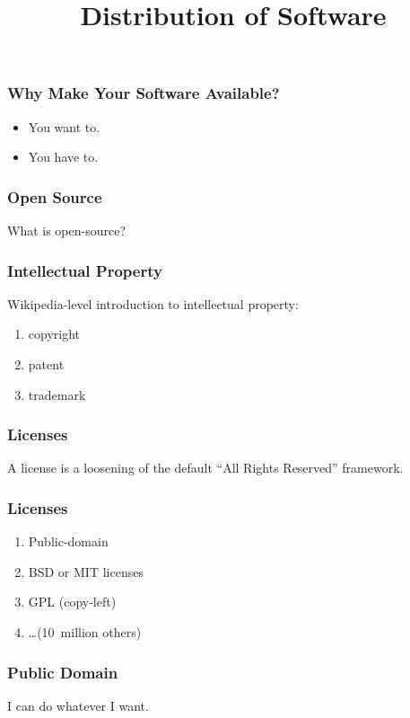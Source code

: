 
\title{Distribution of Software}

\frame{\maketitle}

\begin{frame}[fragile]
\frametitle{Why Make Your Software Available?}

\begin{itemize}
\item You \alert{want} to.
\item You \alert{have} to.
\end{itemize}
%
\end{frame}

\begin{frame}[fragile]
\frametitle{Open Source}
What is open-source?
\end{frame}

\begin{frame}[fragile]
\frametitle{Intellectual Property}
Wikipedia-level introduction to intellectual property:
\begin{enumerate}
\item copyright
\item patent 
\item trademark
\end{enumerate}
\end{frame}

\begin{frame}[fragile]
\frametitle{Licenses}
A license is a \alert{loosening} of the default ``All Rights Reserved'' framework.
\end{frame}

\begin{frame}[fragile]
\frametitle{Licenses}
\begin{enumerate}
\item Public-domain
\item BSD or MIT licenses
\item GPL (copy-left)
\item \ldots (10~million others)
\end{enumerate}
\end{frame}

\begin{frame}[fragile]
\frametitle{Public Domain}

I can do whatever I want.

\end{frame}

